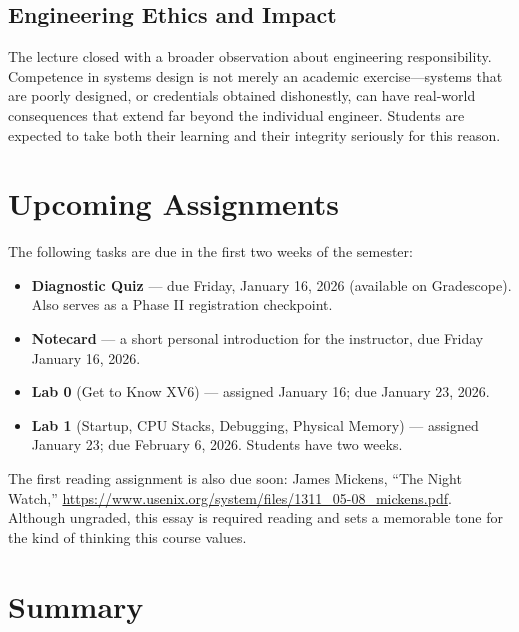 \documentclass[11pt]{article}
\begin{document}
\subsection{Engineering Ethics and Impact}

The lecture closed with a broader observation about engineering responsibility. Competence in
systems design is not merely an academic exercise---systems that are poorly designed, or
credentials obtained dishonestly, can have real-world consequences that extend far beyond the
individual engineer. Students are expected to take both their learning and their integrity
seriously for this reason.

\section{Upcoming Assignments}

The following tasks are due in the first two weeks of the semester:

\begin{itemize}
    \item \textbf{Diagnostic Quiz} --- due Friday, January 16, 2026 (available on Gradescope).
          Also serves as a Phase II registration checkpoint.
    \item \textbf{Notecard} --- a short personal introduction for the instructor, due Friday
          January 16, 2026.
    \item \textbf{Lab 0} (Get to Know XV6) --- assigned January 16; due January 23, 2026.
    \item \textbf{Lab 1} (Startup, CPU Stacks, Debugging, Physical Memory) --- assigned January
          23; due February 6, 2026. Students have two weeks.
\end{itemize}

The first reading assignment is also due soon: James Mickens, ``The Night Watch,''
\url{https://www.usenix.org/system/files/1311_05-08_mickens.pdf}. Although ungraded, this essay
is required reading and sets a memorable tone for the kind of thinking this course values.

\section{Summary}
\end{document}
